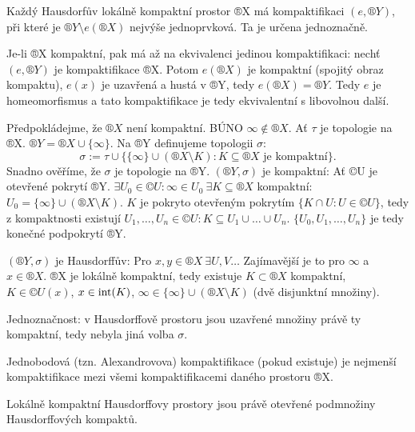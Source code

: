 \documentclass[12pt]{article}					%
\begin{document}
    \begin{tvrzeni}
        Každý Hausdorfův lokálně kompaktní prostor ®X má kompaktifikaci $(e, ®Y)$, při které je $®Y \setminus e(®X)$ nejvýše jednoprvková. Ta je určena jednoznačně.
        \begin{dukazin}
            Je-li ®X kompaktní, pak má až na ekvivalenci jedinou kompaktifikaci: nechť $(e, ®Y)$ je kompaktifikace ®X. Potom $e(®X)$ je kompaktní (spojitý obraz kompaktu), $e(x)$ je uzavřená a hustá v ®Y, tedy $e(®X) = ®Y$. Tedy $e$ je homeomorfismus a tato kompaktifikace je tedy ekvivalentní s libovolnou další.

            Předpokládejme, že $®X$ není kompaktní. BÚNO $∞ \notin ®X$. Ať $\tau$ je topologie na ®X. $®Y = ®X \cup \{∞\}$. Na ®Y definujeme topologii $\sigma$:
            $$\sigma := \tau \cup \{\{∞\} \cup (®X \setminus K): K \subseteq ®X \text{ je kompaktní}\}.$$
            Snadno ověříme, že $\sigma$ je topologie na ®Y. $(®Y, \sigma)$ je kompaktní: Ať ©U je otevřené pokrytí ®Y. $\exists U_0 \in ©U: ∞ \in U_0\ \exists K \subseteq ®X$ kompaktní: $U_0 = \{∞\} \cup (®X \setminus K)$. $K$ je pokryto otevřeným pokrytím $\{K \cap U: U\in ©U\}$, tedy z kompaktnosti existují $U_1, …, U_n \in ©U: K \subseteq U_1 \cup … \cup U_n$. $\{U_0, U_1, …, U_n\}$ je tedy konečné podpokrytí ®Y.

            $(®Y, \sigma)$ je Hausdorffův: Pro $x, y \in ®X\ \exists U, V …$ Zajímavější je to pro $∞$ a $x \in ®X$. ®X je lokálně kompaktní, tedy existuje $K \subset ®X$ kompaktní, $K \in ©U(x)$, $x \in \operatorname{int}(K)$, $∞ \in \{∞\} \cup (®X\setminus K)$ (dvě disjunktní množiny).

            Jednoznačnost: v Hausdorffově prostoru jsou uzavřené množiny právě ty kompaktní, tedy nebyla jiná volba $\sigma$.
        \end{dukazin}
    \end{tvrzeni}

    \begin{poznamka}
        Jednobodová (tzn. Alexandrovova) kompaktifikace (pokud existuje) je nejmenší kompaktifikace mezi všemi kompaktifikacemi daného prostoru ®X.

        Lokálně kompaktní Hausdorffovy prostory jsou právě otevřené podmnožiny Hausdorffových kompaktů.
    \end{poznamka}

\end{document}
